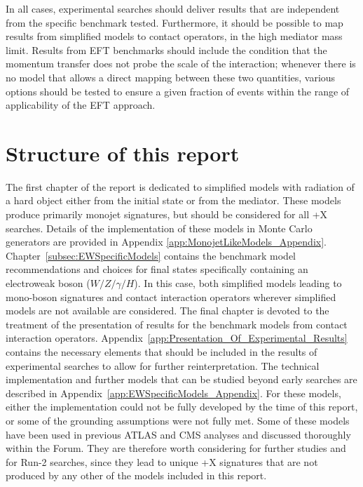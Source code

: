 In all cases, experimental searches should deliver 
results that are independent from the specific benchmark tested. 
Furthermore, it should be possible to map results from simplified models to contact operators,
in the high mediator mass limit. Results from EFT benchmarks should include the condition that
the momentum transfer does not probe the scale of the interaction; whenever there is no model
that allows a direct mapping between these two quantities, various options should be tested to 
ensure a given fraction of events within the range of applicability of the EFT approach.

\section{Structure of this report}

The first chapter of the report is dedicated to simplified
models with radiation of a hard object either from the initial state
or from the mediator. These models produce primarily monojet signatures, 
but should be considered for all \MET{}+X searches.
Details of the implementation of these models in
Monte Carlo generators are provided in
Appendix \ref{app:MonojetLikeModels_Appendix}.
Chapter~\ref{subsec:EWSpecificModels} contains the benchmark model
recommendations and choices for final states specifically containing an electroweak 
boson ($W/Z/\gamma/H$). In this case, both
simplified models leading to mono-boson signatures
and contact interaction operators wherever simplified models are not available are considered. 
The final chapter is devoted to the treatment of the presentation of results for the benchmark
models from contact interaction operators.
Appendix~\ref{app:Presentation_Of_Experimental_Results} contains the necessary elements that
should be included in the results of experimental searches to allow for further reinterpretation. 
The technical implementation and further models that can be studied
beyond early searches are described in Appendix~\ref{app:EWSpecificModels_Appendix}. 
For these models, either the implementation could not be fully developed by the time of this report,
or some of the grounding assumptions were not fully met.  
Some of these models have been used in previous ATLAS and CMS analyses and discussed thoroughly within the Forum. 
They are therefore worth considering for further studies and for Run-2 searches, since they lead to unique \MET{}+X signatures 
that are not produced by any other of the models included in this report. 
